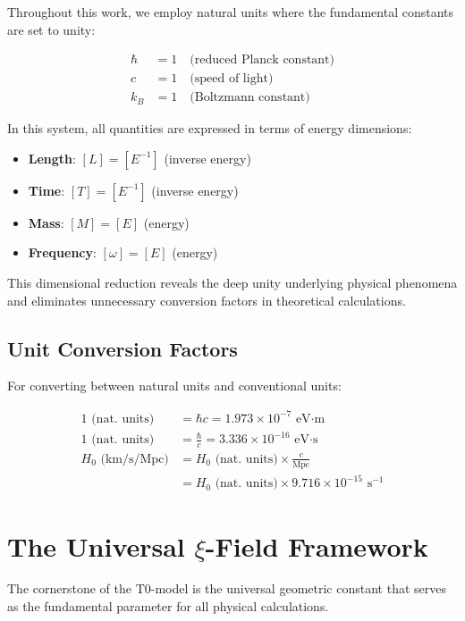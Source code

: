 	Throughout this work, we employ natural units where the fundamental constants are set to unity:
	
	\begin{align}
		\hbar &= 1 \quad \text{(reduced Planck constant)} \\
		c &= 1 \quad \text{(speed of light)} \\
		k_B &= 1 \quad \text{(Boltzmann constant)}
	\end{align}
	
	In this system, all quantities are expressed in terms of energy dimensions:
	\begin{itemize}
		\item \textbf{Length}: $[L] = [E^{-1}]$ (inverse energy)
		\item \textbf{Time}: $[T] = [E^{-1}]$ (inverse energy)
		\item \textbf{Mass}: $[M] = [E]$ (energy)
		\item \textbf{Frequency}: $[\omega] = [E]$ (energy)
	\end{itemize}
	
	This dimensional reduction reveals the deep unity underlying physical phenomena and eliminates unnecessary conversion factors in theoretical calculations.
	
	\subsection{Unit Conversion Factors}
	
	For converting between natural units and conventional units:
	
	\begin{align}
		1 \text{ (nat. units)} &= \hbar c = 1.973 \times 10^{-7} \text{ eV·m} \\
		1 \text{ (nat. units)} &= \frac{\hbar}{c} = 3.336 \times 10^{-16} \text{ eV·s} \\
		H_0 \text{ (km/s/Mpc)} &= H_0 \text{ (nat. units)} \times \frac{c}{\text{Mpc}} \\
		&= H_0 \text{ (nat. units)} \times 9.716 \times 10^{-15} \text{ s}^{-1}
	\end{align}
	
\section{The Universal $\xi$-Field Framework}

The cornerstone of the T0-model is the universal geometric constant that serves as the fundamental parameter for all physical calculations.

